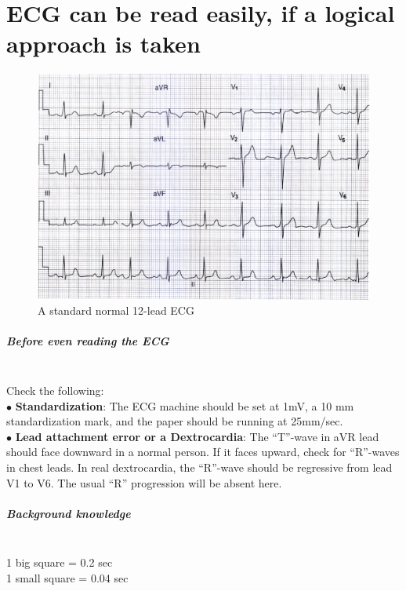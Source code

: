 \documentclass[11pt,a4paper]{report}
\begin{document}
\chapter[Interpretation of ECG]{ECG can be read easily, if a logical approach is taken}

\begin{figure}[htp]
	\centering \includegraphics[scale=0.90]{normal-ecg.png}
	\centering \caption[A standard normal 12-lead ECG]{A standard normal 12-lead ECG \cite{abdullah-ecg}}
	\label{ECG}
\end{figure}


\paragraph{Before even reading the ECG}
~\\ Check the following: \\
$\bullet$ \textbf{Standardization}: The ECG machine should be set at 1mV, a 10 mm standardization mark, and the paper should be running at 25mm/sec. \\
$\bullet$ \textbf{Lead attachment error or a Dextrocardia}: The ``T''-wave in aVR lead should face downward in a normal person. If it faces upward, check for ``R''-waves in chest leads. In real dextrocardia, the ``R''-wave should be regressive from lead V1 to V6. The usual ``R'' progression will be absent here. 

\paragraph{Background knowledge}
~\\ 
1 big square = 0.2 sec\\
1 small square = 0.04 sec \\
\end{document}
